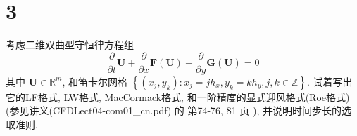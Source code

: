 \documentclass[12pt]{article}
\begin{document}

\section{3}

考虑二维双曲型守恒律方程组
$$
\frac{\partial}{\partial t} \boldsymbol{U}+\frac{\partial}{\partial x} \boldsymbol{F}(\boldsymbol{U})+\frac{\partial}{\partial y} \boldsymbol{G}(\boldsymbol{U})=0
$$
其中 $\boldsymbol{U} \in \mathbb{R}^{m}$, 和笛卡尔网格 $\left\{\left(x_{j}, y_{k}\right): x_{j}=j h_{x}, y_{k}=k h_{y}, j, k \in \mathbb{Z}\right\} .$
试着写出它的LF格式, LW格式, MacCormack格式, 和一阶精度的显式迎风格式(Roe格式) (参见讲义(CFDLect04-com01\_cn.pdf) 的 第74-76, 81 页 ), 并说明时间步长的选取准则.
\end{document}
